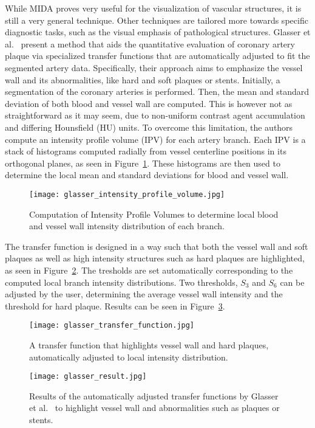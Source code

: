 While MIDA proves very useful for the visualization of vascular structures, it is still a very general technique. Other techniques are tailored more towards specific diagnostic tasks, such as the visual emphasis of pathological structures. Glasser et al.~\cite{glasser2010automatic} present a method that aids the quantitative evaluation of coronary artery plaque via specialized transfer functions that are automatically adjusted to fit the segmented artery data. Specifically, their approach aims to emphasize the vessel wall and its abnormalities, like hard and soft plaques or stents. Initially, a segmentation of the coronary arteries is performed. Then, the mean and standard deviation of both blood and vessel wall are computed. This is however not as straightforward as it may seem, due to non-uniform contrast agent accumulation and differing Hounsfield (HU) units. To overcome this limitation, the authors compute an intensity profile volume (IPV) for each artery branch. Each IPV is a stack of histograms computed radially from vessel centerline positions in its orthogonal planes, as seen in Figure~\ref{fig:glasserIPV}. These histograms are then used to determine the local mean and standard deviations for blood and vessel wall.
\begin{figure}[htb]
  \centering
  \texttt{[image: glasser\_intensity\_profile\_volume.jpg]}
  \caption{\label{fig:glasserIPV} Computation of Intensity Profile Volumes to determine local blood and vessel wall intensity distribution of each branch.}
  \cite{glasser2010automatic}
\end{figure}
The transfer function is designed in a way such that both the vessel wall and soft plaques as well as high intensity structures such as hard plaques are highlighted, as seen in Figure~\ref{fig:glasserTransferFunction}. The tresholds are set automatically corresponding to the computed local branch intensity distributions. Two thresholds, $S_3$ and $S_6$ can be adjusted by the user, determining the average vessel wall intensity and the threshold for hard plaque. Results can be seen in Figure~\ref{fig:glasserResult}.
\begin{figure}[htb]
  \centering
  \texttt{[image: glasser\_transfer\_function.jpg]}
  \caption{\label{fig:glasserTransferFunction} A transfer function that highlights vessel wall and hard plaques, automatically adjusted to local intensity distribution.}
  \cite{glasser2010automatic}
\end{figure}
\begin{figure}[htb]
  \centering
  \texttt{[image: glasser\_result.jpg]}
  \caption{\label{fig:glasserResult} Results of the automatically adjusted transfer functions by Glasser et al.~\cite{glasser2010automatic} to highlight vessel wall and abnormalities such as plaques or stents.}
  \cite{glasser2010automatic}
\end{figure}


